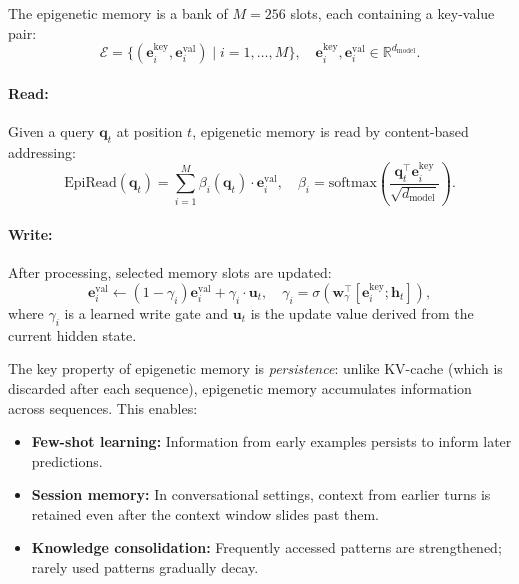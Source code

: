 \begin{dogmadef}
The epigenetic memory is a bank of $M = 256$ slots, each containing a key-value pair:
\begin{equation}
\mathcal{E} = \{(\mathbf{e}_i^{\text{key}}, \mathbf{e}_i^{\text{val}}) \mid i = 1, \ldots, M\}, \quad \mathbf{e}_i^{\text{key}}, \mathbf{e}_i^{\text{val}} \in \mathbb{R}^{d_{\text{model}}}.
\end{equation}

\paragraph{Read:} Given a query $\mathbf{q}_t$ at position $t$, epigenetic memory is read by content-based addressing:
\begin{equation}
\text{EpiRead}(\mathbf{q}_t) = \sum_{i=1}^{M} \beta_i(\mathbf{q}_t) \cdot \mathbf{e}_i^{\text{val}}, \quad \beta_i = \text{softmax}\left(\frac{\mathbf{q}_t^\top \mathbf{e}_i^{\text{key}}}{\sqrt{d_{\text{model}}}}\right).
\end{equation}

\paragraph{Write:} After processing, selected memory slots are updated:
\begin{equation}
\mathbf{e}_i^{\text{val}} \leftarrow (1 - \gamma_i) \mathbf{e}_i^{\text{val}} + \gamma_i \cdot \mathbf{u}_t, \quad \gamma_i = \sigma\left(\mathbf{w}_\gamma^\top [\mathbf{e}_i^{\text{key}}; \mathbf{h}_t]\right),
\end{equation}
where $\gamma_i$ is a learned write gate and $\mathbf{u}_t$ is the update value derived from the current hidden state.
\end{dogmadef}

The key property of epigenetic memory is \emph{persistence}: unlike KV-cache (which is discarded after each sequence), epigenetic memory accumulates information across sequences. This enables:
\begin{itemize}[leftmargin=1.8em]
  \item \textbf{Few-shot learning:} Information from early examples persists to inform later predictions.
  \item \textbf{Session memory:} In conversational settings, context from earlier turns is retained even after the context window slides past them.
  \item \textbf{Knowledge consolidation:} Frequently accessed patterns are strengthened; rarely used patterns gradually decay.
\end{itemize}

